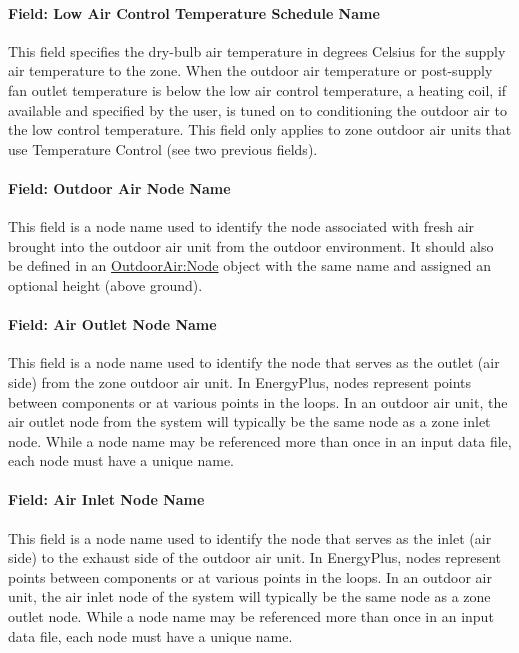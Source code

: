 \paragraph{Field: Low Air Control Temperature Schedule Name}\label{field-low-air-control-temperature-schedule-name}

This field specifies the dry-bulb air temperature in degrees Celsius for the supply air temperature to the zone. When the outdoor air temperature or post-supply fan outlet temperature is below the low air control temperature, a heating coil, if available and specified by the user, is tuned on to conditioning the outdoor air to the low control temperature. This field only applies to zone outdoor air units that use Temperature Control (see two previous fields).

\paragraph{Field: Outdoor Air Node Name}\label{field-outdoor-air-node-name-1-000}

This field is a node name used to identify the node associated with fresh air brought into the outdoor air unit from the outdoor environment. It should also be defined in an \hyperref[outdoorairnode]{OutdoorAir:Node} object with the same name and assigned an optional height (above ground).

\paragraph{Field: Air Outlet Node Name}\label{field-air-outlet-node-name-3-003}

This field is a node name used to identify the node that serves as the outlet (air side) from the zone outdoor air unit. In EnergyPlus, nodes represent points between components or at various points in the loops. In an outdoor air unit, the air outlet node from the system will typically be the same node as a zone inlet node. While a node name may be referenced more than once in an input data file, each node must have a unique name.

\paragraph{Field: Air Inlet Node Name}\label{field-air-inlet-node-name-3-003}

This field is a node name used to identify the node that serves as the inlet (air side) to the exhaust side of the outdoor air unit. In EnergyPlus, nodes represent points between components or at various points in the loops. In an outdoor air unit, the air inlet node of the system will typically be the same node as a zone outlet node. While a node name may be referenced more than once in an input data file, each node must have a unique name.

